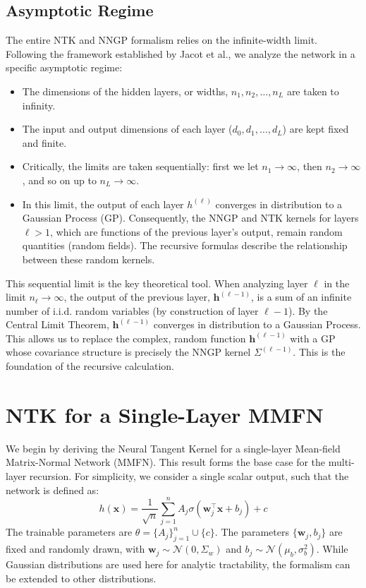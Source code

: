 \documentclass[a4paper]{article}
\begin{document}
\subsection{Asymptotic Regime}
The entire NTK and NNGP formalism relies on the infinite-width limit. Following the framework established by Jacot et al., we analyze the network in a specific asymptotic regime:
\begin{itemize}
    \item The dimensions of the hidden layers, or widths, $n_1, n_2, \dots, n_L$ are taken to infinity.
    \item The input and output dimensions of each layer ($d_0, d_1, \dots, d_L$) are kept fixed and finite.
    \item Critically, the limits are taken sequentially: first we let $n_1 \to \infty$, then $n_2 \to \infty$, and so on up to $n_L \to \infty$.
    \item In this limit, the output of each layer $h^{(\ell)}$ converges in distribution to a Gaussian Process (GP). Consequently, the NNGP and NTK kernels for layers $\ell > 1$, which are functions of the previous layer's output, remain random quantities (random fields). The recursive formulas describe the relationship between these random kernels.
\end{itemize}
This sequential limit is the key theoretical tool. When analyzing layer $\ell$ in the limit $n_\ell \to \infty$, the output of the previous layer, $\bm{h}^{(\ell-1)}$, is a sum of an infinite number of i.i.d. random variables (by construction of layer $\ell-1$). By the Central Limit Theorem, $\bm{h}^{(\ell-1)}$ converges in distribution to a Gaussian Process. This allows us to replace the complex, random function $\bm{h}^{(\ell-1)}$ with a GP whose covariance structure is precisely the NNGP kernel $\Sigma^{(\ell-1)}$. This is the foundation of the recursive calculation.

\section{NTK for a Single-Layer MMFN}
\label{sec:single_layer_mmfn}
We begin by deriving the Neural Tangent Kernel for a single-layer Mean-field Matrix-Normal Network (MMFN). This result forms the base case for the multi-layer recursion. For simplicity, we consider a single scalar output, such that the network is defined as:
\begin{equation}
    h(\bm{x}) = \frac{1}{\sqrt{n}} \sum_{j=1}^n A_j \sigma(\bm{w}_j^\top \bm{x} + b_j) + c
\end{equation}
The trainable parameters are $\theta = \{A_j\}_{j=1}^n \cup \{c\}$. The parameters $\{\bm{w}_j, b_j\}$ are fixed and randomly drawn, with $\bm{w}_j \sim \mathcal{N}(0, \Sigma_w)$ and $b_j \sim \mathcal{N}(\mu_b, \sigma_b^2)$. While Gaussian distributions are used here for analytic tractability, the formalism can be extended to other distributions.
\end{document}
